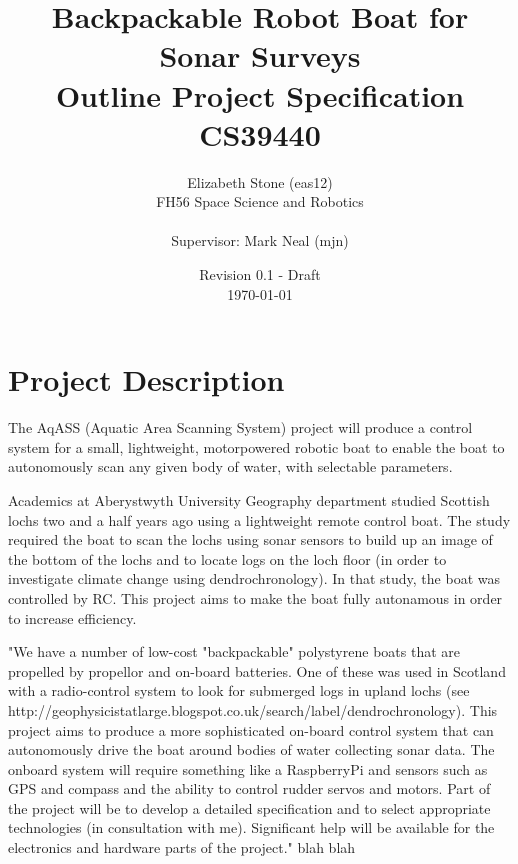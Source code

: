 \documentclass[titlepage 12pt]{article}
\title{Backpackable Robot Boat for Sonar Surveys\\ Outline Project Specification\\ CS39440}
\author{ Elizabeth Stone (eas12)\\FH56 Space Science and Robotics\\ \\Supervisor: Mark Neal (mjn) }
\date{Revision 0.1 - Draft\\ \today\vspace{-3em} }
\begin{document}
{
\selectfont


\begin{titlepage}
	\clearpage\maketitle
\thispagestyle{empty}
	 \vspace{250pt}

	
\end{titlepage}





\section{Project Description}

The AqASS (Aquatic Area Scanning System) project will produce a control system for a small, lightweight, motorpowered robotic boat to enable the boat to autonomously scan any given body of water, with selectable parameters. 

Academics at Aberystwyth University Geography department studied Scottish lochs two and a half years ago using a  lightweight remote control boat. The study required the boat to scan the lochs using sonar sensors to build up an image of the bottom of the lochs and to locate logs on the loch floor (in order to investigate climate change using dendrochronology)\cite{rbates14}. In that study, the boat was controlled by RC. This project aims to make the boat fully autonamous in order to increase efficiency.

"We have a number of low-cost "backpackable" polystyrene boats that are propelled by propellor and on-board batteries. One of these was used in Scotland with a radio-control system to look for submerged logs in upland lochs (see http://geophysicistatlarge.blogspot.co.uk/search/label/dendrochronology)\cite{rbates14}. This project aims to produce a more sophisticated on-board control system that can autonomously drive the boat around bodies of water collecting sonar data. The onboard system will require something like a RaspberryPi and sensors such as GPS and compass and the ability to control rudder servos and motors. Part of the project will be to develop a detailed specification and to select appropriate technologies (in consultation with me). Significant help will be available for the electronics and hardware parts of the project." \cite{mmp}
     blah blah\cite{SDOimg}
     
}
\end{document}
